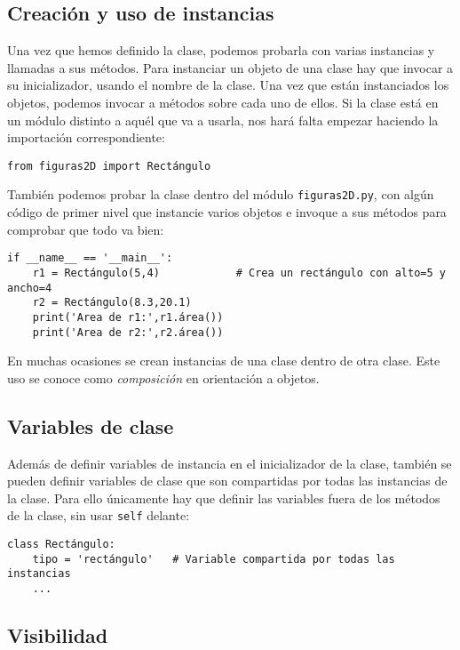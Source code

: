 \subsection{Creación y uso de instancias}

Una vez que hemos definido la clase, podemos probarla con varias instancias y llamadas a sus métodos. Para instanciar un objeto de una clase hay que invocar a su inicializador, usando el nombre de la clase. Una vez que están instanciados los objetos, podemos invocar a métodos sobre cada uno de ellos. Si la clase está en un módulo distinto a aquél que va a usarla, nos hará falta empezar haciendo la importación correspondiente:

\begin{lstlisting}
from figuras2D import Rectángulo
\end{lstlisting}

También podemos probar la clase dentro del módulo \texttt{figuras2D.py}, con algún código de primer nivel que instancie varios objetos e invoque a sus métodos para comprobar que todo va bien:

\begin{lstlisting}
if __name__ == '__main__':
    r1 = Rectángulo(5,4)            # Crea un rectángulo con alto=5 y ancho=4
    r2 = Rectángulo(8.3,20.1)
    print('Area de r1:',r1.área())
    print('Area de r2:',r2.área())
\end{lstlisting}

En muchas ocasiones se crean instancias de una clase dentro de otra clase. Este uso se conoce como \emph{composición} en orientación a objetos.

\subsection{Variables de clase}

Además de definir variables de instancia en el inicializador de la clase, también se pueden definir variables de clase que son compartidas por todas las instancias de la clase. Para ello únicamente hay que definir las variables fuera de los métodos de la clase, sin usar \texttt{self} delante:

\begin{lstlisting}
class Rectángulo:
    tipo = 'rectángulo'   # Variable compartida por todas las instancias
    ...
\end{lstlisting}

\subsection{Visibilidad}

